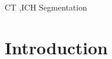\documentclass{elsarticle_nonatbib}\usepackage[]{graphicx}\usepackage[]{color}
\begin{document}
\begin{frontmatter}
\begin{abstract}
%
%
%


\end{abstract}

\begin{keyword}
CT \sep ICH Segmentation
\end{keyword}

\end{frontmatter}




\section{Introduction}


\end{document}
